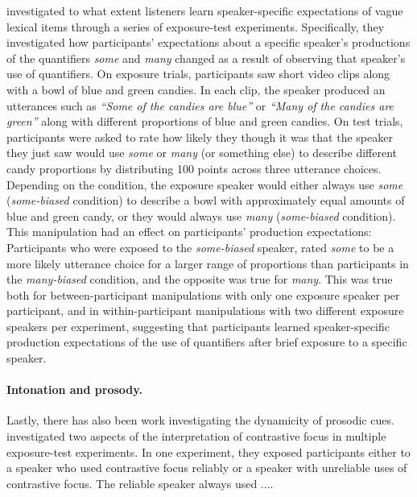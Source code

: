 \cite{Yildirim2016} investigated to what extent listeners learn speaker-specific expectations of vague lexical items through a series of exposure-test experiments.
Specifically, they investigated how participants' expectations about a specific speaker's productions of the quantifiers \textit{some} and \textit{many} changed
as a result of observing that speaker's use of quantifiers. On exposure trials, participants saw short video clips along with a bowl of blue and green candies.
In each clip, the speaker produced an utterances such as \textit{``Some of the candies are blue''} or \textit{``Many of the candies are green''} along with different proportions
of blue and green candies. On test trials, participants were asked to rate how likely they though it was that the speaker they just saw would use \textit{some} or \textit{many} (or something else)
to describe different candy proportions by distributing 100 points across three utterance choices. 
Depending on the condition, the exposure speaker would either always use \textit{some} (\textit{some-biased} condition)  to describe a bowl with approximately 
equal amounts of blue and green candy, or they would always use \textit{many}  (\textit{some-biased} condition). This manipulation had an effect on participants' production
expectations: Participants who were exposed to the \textit{some-biased} speaker, rated \textit{some} to be a more likely utterance choice for a larger range of proportions than
participants in the \textit{many-biased} condition, and the opposite was true for \textit{many}. This was true both for between-participant manipulations with only one exposure speaker per participant,
 and in within-participant manipulations with two different exposure speakers per experiment, suggesting that participants learned speaker-specific production expectations of the use of quantifiers after
 brief exposure to a specific speaker.

\paragraph{Intonation and prosody.} Lastly, there has also been work investigating the dynamicity of prosodic cues. 
\cite{Kurumada2012} investigated two aspects of the interpretation of contrastive focus in multiple exposure-test experiments. 
In one experiment, they exposed participants either to a speaker who used contrastive focus reliably or a speaker with unreliable
uses of contrastive focus. The reliable speaker always used ....




